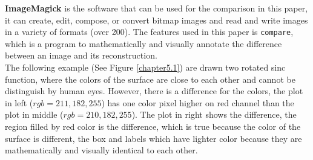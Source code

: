 \documentclass[paper=a4, fontsize=11pt]{report}
\begin{document}
\textbf{ImageMagick} is the software that can be used for the comparison in this paper, it can create, edit, compose, or convert bitmap images and read and write images in a variety of formats (over 200). The features used in this paper is \texttt{compare}, which is a program to mathematically and visually annotate the difference between an image and its reconstruction.\\

The following example (See Figure \ref{chapter5.1}) are drawn two rotated sinc function, where the colors of the surface are close to each other and cannot be distinguish by human eyes. However, there is a difference for the colors, the plot in left ($rgb = 211, 182, 255$) has one color pixel higher on red channel than the plot in middle ($rgb = 210, 182, 255$). The plot in right shows the difference, the region filled by red color is the difference, which is true because the color of the surface is different, the box and labels which have lighter color because they are mathematically and visually identical to each other. \\
\end{document}
